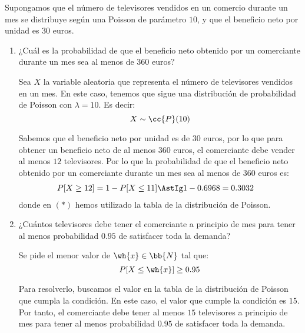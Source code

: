 \begin{ejercicio}
    Supongamos que el número de televisores vendidos en un comercio durante un mes se distribuye
    según una Poisson de parámetro $10$, y que el beneficio neto por unidad es $30$ euros.
    \begin{enumerate}
        \item ¿Cuál es la probabilidad de que el beneficio neto obtenido por un comerciante durante un mes
        sea al menos de $360$ euros?

        Sea $X$ la variable aleatoria que representa el número de televisores vendidos en un mes. En este caso, tenemos que sigue una distribución de probabilidad de Poisson con $\lambda=10$. Es decir:
        \begin{equation*}
            X \sim \cc{P}(10)
        \end{equation*}

        Sabemos que el beneficio neto por unidad es de $30$ euros, por lo que para obtener un beneficio neto de al menos $360$ euros, el comerciante debe vender al menos $12$ televisores. Por lo que la probabilidad de que el beneficio neto obtenido por un comerciante durante un mes sea al menos de $360$ euros es:
        \begin{align*}
            P[X\geq 12] &= 1 - P[X\leq 11] \AstIg 1-0.6968 = 0.3032
        \end{align*}
        donde en $(\ast)$ hemos utilizado la tabla de la distribución de Poisson.

        \item ¿Cuántos televisores debe tener el comerciante a principio de mes para tener al menos probabilidad $0.95$ de satisfacer toda la demanda?
        
        Se pide el menor valor de $\wh{x}\in \bb{N}$ tal que:
        \begin{equation*}
            P[X\leq \wh{x}] \geq 0.95
        \end{equation*}

        Para resolverlo, buscamos el valor en la tabla de la distribución de Poisson que cumpla la condición. En este caso, el valor que cumple la condición es $15$. Por tanto, el comerciante debe tener al menos $15$ televisores a principio de mes para tener al menos probabilidad $0.95$ de satisfacer toda la demanda.
    \end{enumerate}
\end{ejercicio}


